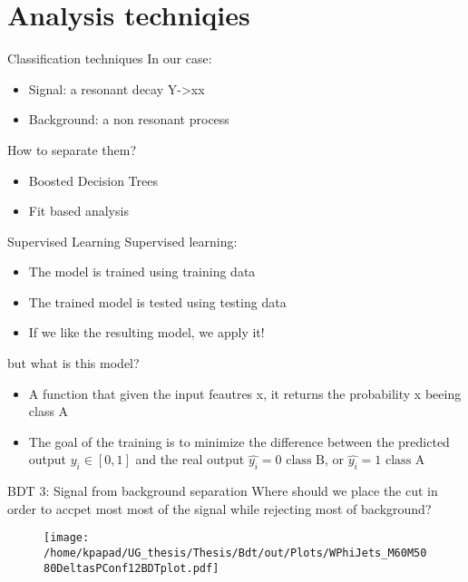 \documentclass[bigger]{beamer}
\begin{document}
\section{Analysis techniqies}
\label{sec:org36c55fb}
\begin{frame}[label={sec:org818f120}]{Classification techniques}
\alert{In our case}:
\begin{itemize}
\item Signal: a resonant decay Y->xx
\item Background: a non resonant process
\end{itemize}
\alert{How to separate them?}
\begin{itemize}
\item Boosted Decision Trees
\item Fit based analysis
\end{itemize}
\end{frame}
\begin{frame}[label={sec:org5fc6b21}]{Supervised Learning}
\alert{Supervised learning}:
\begin{itemize}
\item The model is trained using training data
\item The trained model is tested using testing data
\item If we like the resulting model, we apply it!
\end{itemize}

\alert{but what is this model?}
\begin{itemize}
\item A function that given the input feautres x, it returns the probability x beeing class A
\item The goal of the training is to minimize the difference between the predicted output \(y_{i} \in [0, 1]\) and the real output \(\hat{y_{i}} = 0\text{ class B, or }\hat{y_{i}} = 1\text{ class A}\)
\end{itemize}
\end{frame}
\begin{frame}[label={sec:org58db467}]{BDT 3: Signal from background separation}
Where should we place the cut in order to accpet most most of the  signal while rejecting most of background?
\begin{figure}[hb]
\centering
\texttt{[image: /home/kpapad/UG\_thesis/Thesis/Bdt/out/Plots/WPhiJets\_M60M5080DeltasPConf12BDTplot.pdf]}
\end{figure}
\end{frame}
\end{document}
